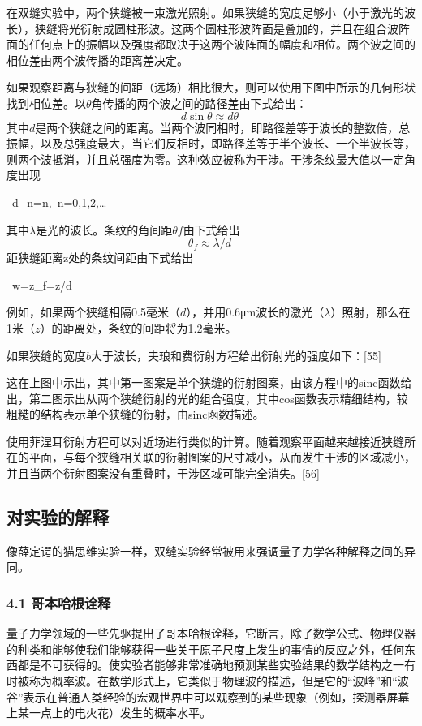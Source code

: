 在双缝实验中，两个狭缝被一束激光照射。如果狭缝的宽度足够小（小于激光的波长），狭缝将光衍射成圆柱形波。这两个圆柱形波阵面是叠加的，并且在组合波阵面的任何点上的振幅以及强度都取决于这两个波阵面的幅度和相位。两个波之间的相位差由两个波传播的距离差决定。

如果观察距离与狭缝的间距（远场）相比很大，则可以使用下图中所示的几何形状找到相位差。以$\theta$角传播的两个波之间的路径差由下式给出：
$$d \sin\theta\approx d\theta~$$
其中$d$是两个狭缝之间的距离。当两个波同相时，即路径差等于波长的整数倍，总振幅，以及总强度最大，当它们反相时，即路径差等于半个波长、一个半波长等，则两个波抵消，并且总强度为零。这种效应被称为干涉。干涉条纹最大值以一定角度出现

~d\theta_{n}=n\lambda,~n=0,1,2,\ldots

其中$\lambda$是光的波长。条纹的角间距$\theta f$由下式给出
$$\theta_f\approx \lambda/d~$$
距狭缝距离z处的条纹间距由下式给出

~w=z\theta_{f}=z\lambda/d

例如，如果两个狭缝相隔0.5毫米（$d$），并用0.6μm波长的激光（$\lambda$）照射，那么在1米（$z$）的距离处，条纹的间距将为1.2毫米。

如果狭缝的宽度$b$大于波长，夫琅和费衍射方程给出衍射光的强度如下：[55]

这在上图中示出，其中第一图案是单个狭缝的衍射图案，由该方程中的sinc函数给出，第二图示出从两个狭缝衍射的光的组合强度，其中cos函数表示精细结构，较粗糙的结构表示单个狭缝的衍射，由sinc函数描述。

使用菲涅耳衍射方程可以对近场进行类似的计算。随着观察平面越来越接近狭缝所在的平面，与每个狭缝相关联的衍射图案的尺寸减小，从而发生干涉的区域减小，并且当两个衍射图案没有重叠时，干涉区域可能完全消失。[56]

\subsection{对实验的解释}
像薛定谔的猫思维实验一样，双缝实验经常被用来强调量子力学各种解释之间的异同。
\subsubsection{4.1 哥本哈根诠释}
量子力学领域的一些先驱提出了哥本哈根诠释，它断言，除了数学公式、物理仪器的种类和能够使我们能够获得一些关于原子尺度上发生的事情的反应之外，任何东西都是不可获得的。使实验者能够非常准确地预测某些实验结果的数学结构之一有时被称为概率波。在数学形式上，它类似于物理波的描述，但是它的“波峰”和“波谷”表示在普通人类经验的宏观世界中可以观察到的某些现象（例如，探测器屏幕上某一点上的电火花）发生的概率水平。

